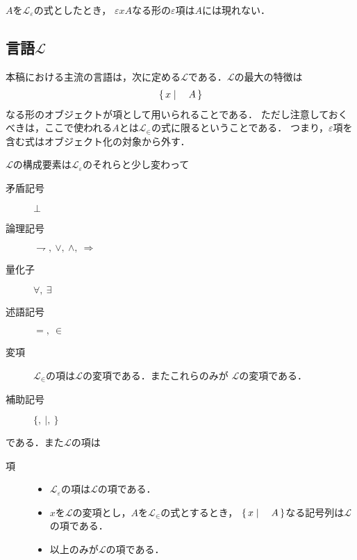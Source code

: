 	\begin{screen}
		\begin{metathm}[無限入れ子は起こらない]
			$A$を$\mathcal{L}_{\varepsilon}$の式としたとき，
			$\varepsilon x A$なる形の$\varepsilon$項は$A$には現れない．
		\end{metathm}
	\end{screen}
	
\subsection{言語$\mathcal{L}$}
	本稿における主流の言語は，次に定める$\mathcal{L}$である．$\mathcal{L}$の最大の特徴は
	\begin{align}
		\left\{\, x \mid \quad A\, \right\}
	\end{align}
	なる形のオブジェクトが項として用いられることである．
	ただし注意しておくべきは，ここで使われる$A$とは$\mathcal{L}_{\in}$の式に限るということである．
	つまり，$\varepsilon$項を含む式はオブジェクト化の対象から外す．
	
	$\mathcal{L}$の構成要素は$\mathcal{L}_{\varepsilon}$のそれらと少し変わって
	
	\begin{description}
		\item[矛盾記号] $\bot$
		\item[論理記号] $\rightharpoondown,\ \vee,\ \wedge,\ \Longrightarrow$
		\item[量化子] $\forall,\ \exists$
		\item[述語記号] $=,\ \in$
		\item[変項] $\mathcal{L}_{\in}$の項は$\mathcal{L}$の変項である．またこれらのみが
			$\mathcal{L}$の変項である．
		\item[補助記号] $\{,\ |,\ \}$
	\end{description}
	
	である．また$\mathcal{L}$の項は
	
	\begin{description}
		\item[項] 
			\begin{itemize}
				\item $\mathcal{L}_{\varepsilon}$の項は$\mathcal{L}$の項である．
				\item $x$を$\mathcal{L}$の変項とし，$A$を$\mathcal{L}_{\in}$の式とするとき，
					$\left\{\, x \mid \quad A\, \right\}$なる記号列は$\mathcal{L}$の項である．
				\item 以上のみが$\mathcal{L}$の項である．
			\end{itemize}
	\end{description}
	

